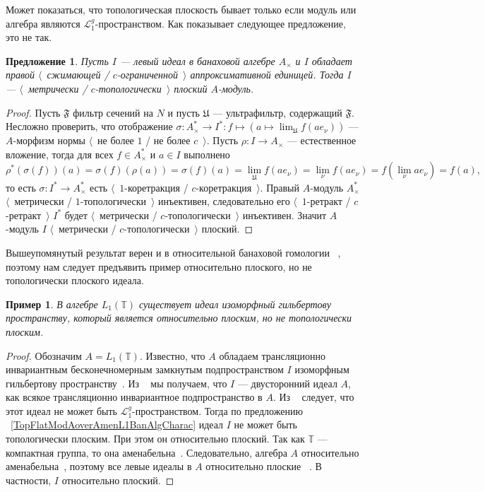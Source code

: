 \documentclass[12pt]{article}
\newtheorem{proposition}[theorem]{Предложение}
\newtheorem{example}[theorem]{Пример}
\begin{document}
Может показаться, что топологическая плоскость бывает только если модуль или
алгебра являются $\mathcal{L}_1^g$-пространством. Как показывает следующее
предложение, это не так.

\begin{proposition}\label{MetTopFlatIdealsInUnitalAlg} Пусть $I$ --- левый идеал
в банаховой алгебре $A_\times $ и $I$ обладает правой $\langle$~сжимающей /
$c$-ограниченной~$\rangle$ аппроксимативной единицей. Тогда $I$ ---
$\langle$~метрически / $c$-топологически~$\rangle$ плоский $A$-модуль.
\end{proposition}
\begin{proof} Пусть $\mathfrak{F}$ фильтр сечений на $N$ и пусть $\mathfrak{U}$
--- ультрафильтр, содержащий $\mathfrak{F}$. Несложно проверить, что отображение
$\sigma:A_\times ^*\to I^*:f\mapsto (a\mapsto \lim_{\mathfrak{U}}f(ae_\nu))$ ---
$A$-морфизм нормы $\langle$~не более $1$ / не более $c$~$\rangle$. Пусть
$\rho:I\to A_\times$ --- естественное вложение, тогда для всех $f\in A_\times^*$
и $a\in I$ выполнено
\[
\rho^*(\sigma(f))(a)
=\sigma(f)(\rho(a))
=\sigma(f)(a)
=\lim_{\mathfrak{U}}f(a e_\nu)
=\lim_{\nu}f(a e_\nu)
=f(\lim_{\nu}a e_\nu)
=f(a),
\]
то есть $\sigma:I^*\to A_\times^*$ есть $\langle$~$1$-коретракция /
$c$-коретракция~$\rangle$. Правый $A$-модуль $A_\times ^*$ $\langle$~метрически
/ $1$-топологически~$\rangle$ инъективен, следовательно его
$\langle$~$1$-ретракт / $c$-ретракт~$\rangle$ $I^*$ будет $\langle$~метрически /
$c$-топологически~$\rangle$ инъективен. Значит $A$-модуль $I$
$\langle$~метрически / $c$-топологически~$\rangle$ плоский.
\end{proof}

Вышеупомянутый результат верен и в относительной банаховой гомологии
~\cite[предложение 7.1.45]{HelBanLocConvAlg}, поэтому нам следует предъявить
пример относительно плоского, но не топологически плоского идеала.

\begin{example} В алгебре $L_1(\mathbb{T})$ существует идеал изоморфный
гильбертову пространству, который является относительно плоским, но не
топологически плоским.
\end{example}
\begin{proof}
Обозначим $A=L_1(\mathbb{T})$. Известно, что $A$ обладаем трансляционно
инвариантным бесконечномерным замкнутым подпространством $I$ изоморфным
гильбертову пространству~\cite[страница 52]{RosProjTransInvSbspLpG}. Из
~\cite[предложение 1.4.7]{KaniBanAlg} мы получаем, что $I$ --- двусторонний
идеал $A$, как всякое трансляционно инвариантное подпространство в $A$. Из
~\cite[параграф 23.3]{DefFloTensNorOpId} следует, что этот идеал не может быть
$\mathcal{L}_1^g$-пространством. Тогда по предложению
~\ref{TopFlatModAoverAmenL1BanAlgCharac} идеал $I$ не может быть топологически
плоским. При этом он относительно плоский. Так как $\mathbb{T}$ --- компактная
группа, то она аменабельна~\cite[предложение 3.12.1]{PierAmenLCA}.
Следовательно, алгебра $A$ относительно аменабельна~\cite[предложение
VII.1.86]{HelBanLocConvAlg}, поэтому все левые идеалы в $A$ относительно плоские
~\cite[предложение VII.1.60(I)]{HelBanLocConvAlg}. В частности, $I$ относительно
плоский.
\end{proof}
\end{document}
